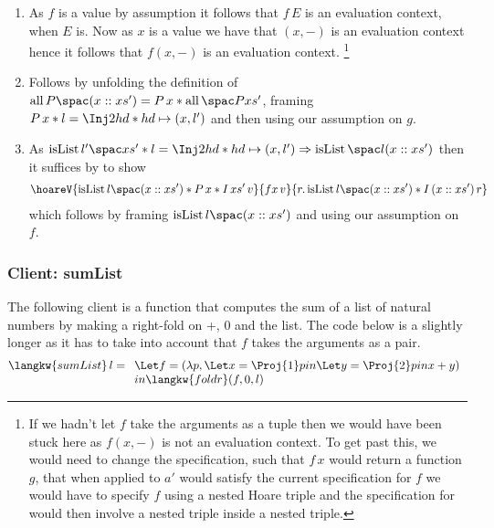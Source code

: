 \begin{enumerate}
\item As $f$ is a value by assumption it follows that $f \, E$ is an evaluation context, when $E$ is.
  Now as $x$ is a value we have that $(x, -)$ is an evaluation context hence it follows that $f (x, - )$ is an evaluation context.%
  \footnote{If we hadn't let $f$ take the arguments as a tuple then we would have been stuck here as $f (x, -)$ is not an evaluation context.
  To get past this, we would need to change the specification, such that $f \, x$ would return a function $g$, that when applied to $a'$ would satisfy the current specification for $f$ \ie{} we would have to specify $f$ using a nested Hoare triple and the specification for  would then involve a nested triple inside a nested triple.}

\item Follows by unfolding the definition of $\all {P} {(x::xs')} = P \, x \ast \all {P} {xs'}$, framing $P \, x \ast l = \Inj2 hd \ast hd \pointsto (x,l')$ and then using our assumption on $g$.

\item As $ \isList {l'} {xs'} \ast l = \Inj2 hd \ast hd \pointsto (x,l') \implies \isList {l} {(x::xs')} $ then it suffices by  to show
  \begin{align*}
    \hoareV{ \isList {l} {(x::xs')} \ast P\, x \ast I \, xs' \, v  }
    {f x \, v}
    {r. \isList {l} {(x::xs')} \ast I \, (x::xs') \, r}
  \end{align*}
  which follows by framing $\isList {l} {(x::xs')}$ and using our assumption
  on $f$.
\end{enumerate}

\subsubsection*{Client: sumList}
The following client is a function that computes the sum of a list of natural numbers by making a right-fold on +, 0 and the list. The code below is  a slightly longer as it has to take into account that $f$ takes the arguments as a pair. 
\begin{displaymath}
    \langkw{sumList} \, l =
    \begin{array}[t]{l}
    \Let f = (\lambda p, \Let x = \Proj{1} p in \Let y = \Proj{2} p in x + y)\\
   		 in \langkw{foldr}(f, 0, l)
    \end{array}
  \end{displaymath}


